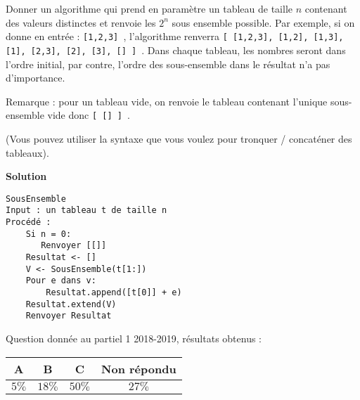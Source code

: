 
\begin{exercice}[Partiel 2018-2019]
Donner un algorithme qui prend en paramètre un tableau de taille $n$ contenant des valeurs distinctes et renvoie les $2^n$ sous ensemble possible.
Par exemple, si on donne en entrée : {\tt [1,2,3] }, l'algorithme renverra {\tt [ [1,2,3], [1,2], [1,3], [1], [2,3], [2], [3], [] ] }. Dans
chaque tableau, les nombres seront dans l'ordre initial, par contre, l'ordre des sous-ensemble dans le résultat n'a pas d'importance. 

Remarque : pour un tableau vide, on renvoie le tableau contenant l'unique sous-ensemble vide donc {\tt [ [] ] }.

(Vous pouvez utiliser la syntaxe que vous voulez pour tronquer / concaténer des tableaux).


\textbf{Solution}

\vspace{0.5cm}

\begin{lstlisting}
SousEnsemble
Input : un tableau t de taille n
Procédé :
    Si n = 0:
       Renvoyer [[]]
    Resultat <- []
    V <- SousEnsemble(t[1:])
    Pour e dans v:
        Resultat.append([t[0]] + e)
    Resultat.extend(V)
    Renvoyer Resultat
\end{lstlisting}

Question donnée au partiel 1 2018-2019, résultats obtenus :

\begin{tabular}{|c|c|c|c|}
\hline
A & B & C & Non répondu  \\ \hline
$5\%$ & $18\%$ & $50\%$ & $27\%$ \\ \hline
\end{tabular} 
\end{exercice}